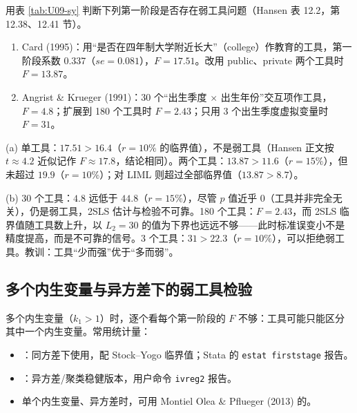 \begin{exmp}\label{ex:U09-sycases}
用表 \ref{tab:U09-sy} 判断下列第一阶段是否存在弱工具问题（Hansen 表 12.2，第 12.38、12.41 节）。
\begin{enumerate}[label=(\alph*)]
  \item Card (1995)：用“是否在四年制大学附近长大”（college）作教育的工具，第一阶段系数 0.337（$se=0.081$），$F=17.51$。改用 public、private 两个工具时 $F=13.87$。
  \item Angrist \& Krueger (1991)：30 个“出生季度 $\times$ 出生年份”交互项作工具，$F=4.8$；扩展到 180 个工具时 $F=2.43$；只用 3 个出生季度虚拟变量时 $F=31$。
\end{enumerate}
\solution
(a) 单工具：$17.51>16.4$（$r=10\%$ 的临界值），不是弱工具（Hansen 正文按 $t\approx4.2$ 近似记作 $F\approx17.8$，结论相同）。两个工具：$13.87>11.6$（$r=15\%$），但未超过 $19.9$（$r=10\%$）；对 LIML 则超过全部临界值（$13.87>8.7$）。

(b) 30 个工具：$4.8$ 远低于 $44.8$（$r=15\%$），尽管 $p$ 值近乎 0（工具并非完全无关），仍是弱工具，2SLS 估计与检验不可靠。180 个工具：$F=2.43$，而 2SLS 临界值随工具数上升，以 $L_2=30$ 的值为下界也远远不够——此时标准误变小不是精度提高，而是不可靠的信号。3 个工具：$31>22.3$（$r=10\%$），可以拒绝弱工具。教训：工具“少而强”优于“多而弱”。
\end{exmp}

\subsection{多个内生变量与异方差下的弱工具检验}

\begin{extend}
多个内生变量（$k_1>1$）时，逐个看每个第一阶段的 $F$ 不够：工具可能只能区分其中一个内生变量。常用统计量：
\begin{itemize}
  \item {}：同方差下使用，配 Stock--Yogo 临界值；Stata 的 \texttt{estat firststage} 报告。
  \item {}：异方差/聚类稳健版本，用户命令 \texttt{ivreg2} 报告。
  \item 单个内生变量、异方差时，可用 Montiel Olea \& Pflueger (2013) 的。
\end{itemize}
\end{extend}

